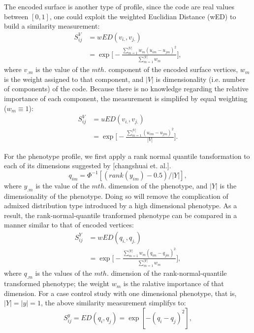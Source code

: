 \documentclass[twocolumn]{article}
\begin{document}
The encoded surface is another type of profile, since the code are real values between $[0,1]$, one could exploit the weighted Euclidian Distance (wED) to build a similarity measurement:
\begin{equation} \label{eq_wSV}
\begin{split}
  S_{ij}^V &= wED(v_{i.},v_{j.}) \\
  &= \exp
  {
    \Big[-\frac{\sum_{m=1}^{|V|}{w_m(u_{im}-u_{jm})^2}} {\sum_{m=1}^{|V|}{w_m}}\Big]
  },
\end{split}
\end{equation}
where $v_{.m}$ is the value of the $m th.$ component of the encoded surface vertices, $w_m$ is the weight assigned to that component, and $|V|$ is dimensionality (i.e. number of components) of the code. Because there is no knowledge regarding the relative importance of each component, the measurement is simplifed by equal weighting ($w_m \equiv 1$):
\begin{equation*} \label{eq_uSV}
\begin{split}
  S_{ij}^V &= uED(v_{i.},v_{j.}) \\
  &= \exp
  {
    \Big[-\frac{\sum_{m=1}^{|V|}{(u_{im}-u_{jm})^2}} {|V|}\Big]
  }.
\end{split}
\end{equation*}

For the phenotype profile, we first apply a rank normal quantile tansformation to each of its dimensions suggested by [changshuai et. al.]. 
\begin{displaymath}
  q_{im}=\Phi^{-1}[(rank(y_{im})-0.5)/|Y|],
\end{displaymath} 
where $y_{.m}$ is the value of the $m th.$ dimension of the phenotype, and $|Y|$ is the dimensionality of the phenotype. Doing so will remove the complication of admixed distribution type introduced by a high dimensional phenotype. As a result, the rank-normal-quantile tranformed phenotype can be compared in a manner similar to that of encoded vertices:
\begin{equation} \label{eq_wSY}
\begin{split}
  S_{ij}^Y &= wED(q_{i.},q_{j.}) \\
  &=\exp
  {
    \Big[-\frac{\sum_{m=1}^{|Y|}{w_m(q_{im}-q_{jm})^2}} {\sum_{m=1}^{|Y|}{w_m}}\Big]
  },
\end{split}
\end{equation}
where $q_{.m}$ is the values of the $m th.$ dimension of the rank-normal-quantile transformed phenotype; the weight $w_m$ is the ralative importance of that dimension. For a case control study with one dimensional phenotype, that is, $|Y|=|y|=1$, the above similarity measurement simplifys to:
\begin{displaymath}
  S_{ij}^{y}=ED(q_i,q_j)=\exp{[-(q_i-q_j)^2]},
\end{displaymath}
\end{document}
